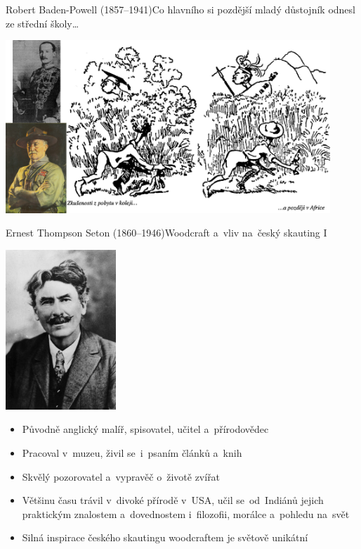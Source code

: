 \documentclass[compress, ucs, xelatex, 11pt, xcolor=dvipsnames, print, aspectratio=169,
	hyperref={
		bookmarks=true,
		unicode=true,
		colorlinks=true,
		pdftitle={Skautska vychovna metoda},
		plainpages=false,
		pdfauthor={Vojtech Zeisek},
		pdfsubject={Skautska vychovna metoda a jeji vyvoj za posledni stoleti a desetileti},
		pdfcreator={XeLaTeX},
		pdfkeywords={Junak, Pedagogika, Skaut, Skauting, Vychovna metoda},
		linkcolor=Red, %
		anchorcolor=ForestGreen, %
		citecolor=ForestGreen, %
		filecolor=ForestGreen, %
		menucolor=ForestGreen, %
		urlcolor=Sepia, %
		pdftex},
	url={hyphens, lowtilde} %
	]{beamer}
\begin{document}
\begin{frame}{Robert Baden-Powell (1857--1941)}{Co hlavního si pozdější mladý důstojník odnesl ze střední školy\ldots}
	\begin{center}
		\includegraphics[height=6.5cm]{bp.jpg}
	\end{center}
\end{frame}

\begin{frame}{Ernest Thompson Seton (1860--1946)}{Woodcraft a~vliv na~český skauting I}
	\begin{multicols}{2}
		\begin{center}
			\includegraphics[height=6cm]{seton.jpg}
		\end{center}
		\columnbreak
		\begin{itemize}
			\item Původně anglický malíř, spisovatel, učitel a~přírodovědec
			\item Pracoval v~muzeu, živil se~i~psaním článků a~knih
			\item Skvělý pozorovatel a~vypravěč o~životě zvířat
			\item Většinu času trávil v~divoké přírodě v~USA, učil se~od~Indiánů jejich praktickým znalostem a~dovednostem i~filozofii, morálce a~pohledu na~svět
			\item Silná inspirace českého skautingu woodcraftem je světově unikátní
		\end{itemize}
	\end{multicols}
\end{frame}
\end{document}
